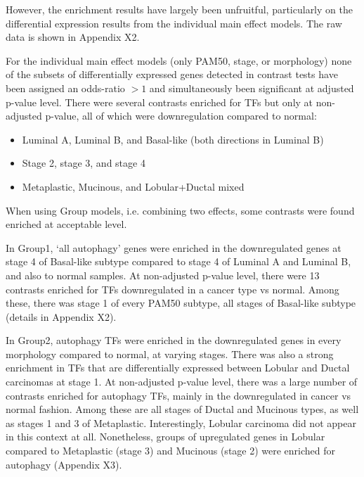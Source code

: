         However, the enrichment results have largely been unfruitful, particularly on the differential expression results from the individual main effect models. The raw data is shown in Appendix X2. 
        
        For the individual main effect models (only PAM50, stage, or morphology) none of the subsets of differentially expressed genes detected in contrast tests have been assigned an odds-ratio $>1$ and simultaneously been significant at adjusted p-value level. There were several contrasts enriched for TFs but only at non-adjusted p-value, all of which were downregulation compared to normal:
        
        \begin{itemize}
            \item Luminal A, Luminal B, and Basal-like  (both directions in Luminal B)
            \item Stage 2, stage 3, and stage 4 
            \item Metaplastic, Mucinous, and Lobular+Ductal mixed \\
        \end{itemize}
        
        \vspace{5mm}
        When using Group models, i.e. combining two effects, some contrasts were found enriched at acceptable level.
        
        In Group1, ‘all autophagy’ genes were enriched in the downregulated genes at stage 4 of Basal-like subtype compared to stage 4 of Luminal A and Luminal B, and also to normal samples. At non-adjusted p-value level, there were 13 contrasts enriched for TFs downregulated in a cancer type vs normal. Among these, there was stage 1 of every PAM50 subtype, all stages of Basal-like subtype (details in Appendix X2). 
         
        In Group2, autophagy TFs were enriched in the downregulated genes in every morphology compared to normal, at varying stages. There was also a strong enrichment in TFs that are differentially expressed between Lobular and Ductal carcinomas at stage 1. At non-adjusted p-value level, there was a large number of contrasts enriched for autophagy TFs, mainly in the downregulated in cancer vs normal fashion. Among these are all stages of Ductal and Mucinous types, as well as stages 1 and 3 of Metaplastic. Interestingly, Lobular carcinoma did not appear in this context at all. Nonetheless, groups of upregulated genes in Lobular compared to Metaplastic (stage 3) and Mucinous (stage 2) were enriched for autophagy (Appendix X3). 
        
